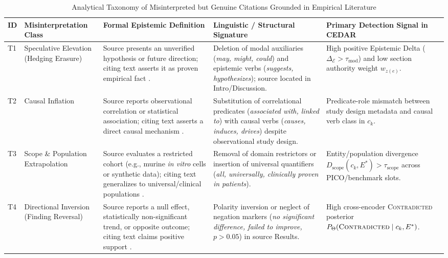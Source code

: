 \documentclass[journal]{IEEEtran}
\begin{document}
\begin{table}[t]
\centering
\footnotesize
\caption{Analytical Taxonomy of Misinterpreted but Genuine Citations Grounded in Empirical Literature}
\label{tab:misinterpretation_taxonomy}
\renewcommand{\arraystretch}{1.14}
\begin{tabularx}{\textwidth}{L{0.5cm} L{3.0cm} L{4.2cm} L{4.2cm} Y}
\toprule
\textbf{ID} & \textbf{Misinterpretation Class} & \textbf{Formal Epistemic Definition} & \textbf{Linguistic / Structural Signature} & \textbf{Primary Detection Signal in CEDAR} \\
\midrule
T1 & Speculative Elevation (Hedging Erasure) & Source presents an unverified hypothesis or future direction; citing text asserts it as proven empirical fact \cite{greenberg2009citation,hyland1998hedging}. & Deletion of modal auxiliaries (\emph{may, might, could}) and epistemic verbs (\emph{suggests, hypothesizes}); source located in Intro/Discussion. & High positive Epistemic Delta ($\Delta_{\mathcal{E}} > \tau_{\text{mod}}$) and low section authority weight $w_{z(e)}$. \\
T2 & Causal Inflation & Source reports observational correlation or statistical association; citing text asserts a direct causal mechanism \cite{jergas2015quotation,mogull2017accuracy}. & Substitution of correlational predicates (\emph{associated with, linked to}) with causal verbs (\emph{causes, induces, drives}) despite observational study design. & Predicate-role mismatch between study design metadata and causal verb class in $c_k$. \\
T3 & Scope \& Population Extrapolation & Source evaluates a restricted cohort (e.g., murine \emph{in vitro} cells or synthetic data); citing text generalizes to universal/clinical populations \cite{begley2012raise,pavlovic2021accurate}. & Removal of domain restrictors or insertion of universal quantifiers (\emph{all, universally, clinically proven in patients}). & Entity/population divergence $D_{\text{scope}}(c_k, E^*) > \tau_{\text{scope}}$ across PICO/benchmark slots. \\
T4 & Directional Inversion (Finding Reversal) & Source reports a null effect, statistically non-significant trend, or opposite outcome; citing text claims positive support \cite{delacey1985accurate,todd2010marine}. & Polarity inversion or neglect of negation markers (\emph{no significant difference, failed to improve, $p > 0.05$}) in source Results. & High cross-encoder \textsc{Contradicted} posterior $P_{\Theta}(\textsc{Contradicted} \mid c_k, E^*)$. \\

\end{tabularx}
\end{table}
\end{document}
